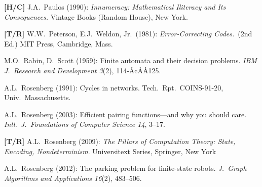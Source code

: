 \begin{thebibliography}{999}

{\bf [H/C]}
J.A.~Paulos (1990):
{\it Innumeracy: Mathematical Iliteracy and Its Consequences.}
Vintage Books (Random House), New York.

{\bf [T/R]}
W.W.~Peterson, E.J.~Weldon, Jr.~(1981):
{\it Error-Correcting Codes.}~(2nd Ed.)
MIT Press, Cambridge, Mass.



M.O.~Rabin, D.~Scott (1959): Finite automata and their decision problems.  {\it IBM J.~Research and Development 3}(2), 114-Ã¢ÂÂ125.






A.L.~Rosenberg (1991): Cycles in networks.  Tech.~Rpt.~COINS-91-20, Univ.~Massachusetts.


A.L.~Rosenberg (2003): Efficient pairing functions---and why you should care.  {\it Intl.~J.~Foundations of Computer Science 14}, 3--17.

{\bf [T/R]}
A.L.~Rosenberg (2009):
{\it The Pillars of Computation Theory: State, Encoding, Nondeterminism}.
Universitext Series, Springer, New York 

A.L.~Rosenberg (2012): The parking problem for finite-state robots.  {\it J.~Graph Algorithms and Applications 16}(2), 483--506.


\end{thebibliography}
